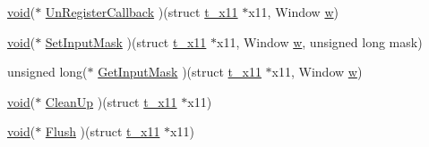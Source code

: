 \begin{DoxyCompactItemize}
\item 
\hyperlink{nbnxn__kernel__simd__4xn__outer_8h_a8dc3f4a797ed992dff49d2fa3477eee8}{void}($\ast$ \hyperlink{structt__x11_ade8d8f2db3ca68085c9fefce5fb58cfb}{\-Un\-Register\-Callback} )(struct \hyperlink{structt__x11}{t\-\_\-x11} $\ast$x11, \-Window \hyperlink{share_2template_2gromacs_2gmx__lapack_8h_adf78cb898ff892dd3fa9c4a1da899392}{w})
\item 
\hyperlink{nbnxn__kernel__simd__4xn__outer_8h_a8dc3f4a797ed992dff49d2fa3477eee8}{void}($\ast$ \hyperlink{structt__x11_a1c49865162e6490abc3ebf34f6c26233}{\-Set\-Input\-Mask} )(struct \hyperlink{structt__x11}{t\-\_\-x11} $\ast$x11, \-Window \hyperlink{share_2template_2gromacs_2gmx__lapack_8h_adf78cb898ff892dd3fa9c4a1da899392}{w}, unsigned long mask)
\item 
unsigned long($\ast$ \hyperlink{structt__x11_a826befb42be3889dc30ee560e3bca54b}{\-Get\-Input\-Mask} )(struct \hyperlink{structt__x11}{t\-\_\-x11} $\ast$x11, \-Window \hyperlink{share_2template_2gromacs_2gmx__lapack_8h_adf78cb898ff892dd3fa9c4a1da899392}{w})
\item 
\hyperlink{nbnxn__kernel__simd__4xn__outer_8h_a8dc3f4a797ed992dff49d2fa3477eee8}{void}($\ast$ \hyperlink{structt__x11_ace0cdeaecfcce2ce5849bc06605f2875}{\-Clean\-Up} )(struct \hyperlink{structt__x11}{t\-\_\-x11} $\ast$x11)
\item 
\hyperlink{nbnxn__kernel__simd__4xn__outer_8h_a8dc3f4a797ed992dff49d2fa3477eee8}{void}($\ast$ \hyperlink{structt__x11_af00975965aac02bf818fb2a91f3c9c63}{\-Flush} )(struct \hyperlink{structt__x11}{t\-\_\-x11} $\ast$x11)
\end{DoxyCompactItemize}


